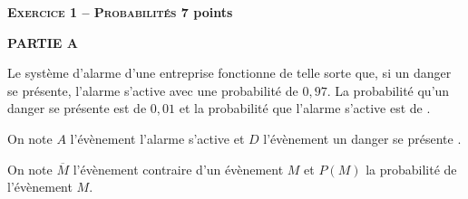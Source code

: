 \textbf{\Large\textsc{Exercice 1 -- Probabilités} \hfill 7 points}

\medskip

\textbf{PARTIE A}

\medskip

Le système d'alarme d'une entreprise fonctionne de telle sorte que, si un danger se présente, l'alarme s'active avec une probabilité de $0,97$. 
La probabilité qu'un danger se présente est de $0,01$ et la probabilité que l'alarme s'active est de .

On note $A$ l'évènement \og  l'alarme s'active \fg{}  et $D$ l'évènement \og  un danger se présente \fg . 

On note $\overline{M}$ l'évènement contraire d'un évènement $M$ et $P(M)$ la probabilité de l'évènement $M$.


